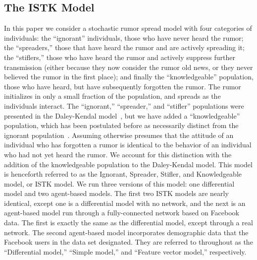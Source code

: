 \subsection{The ISTK Model}
\label{subsec:istk}

In this paper we consider a stochastic rumor spread model with four categories of individuals: the ``ignorant'' individuals, those who have never heard the rumor; the ``spreaders,'' those that have heard the rumor and are actively spreading it; the ``stiflers,'' those who have heard the rumor and actively suppress further transmission (either because they now consider the rumor old news, or they never believed the rumor in the first place); and finally the ``knowledgeable'' population, those who have heard, but have subsequently forgotten the rumor.
The rumor initializes in only a small fraction of the population, and spreads as the individuals interact.
The ``ignorant,'' ``spreader,'' and ``stifler'' populations were presented in the Daley-Kendal model~\cite{daley-1965}, but we have added a ``knowledgeable'' population, which has been postulated before as necessarily distinct from the ignorant population~\cite{zhao-2012, zhao-2011}.
Assuming otherwise presumes that the attitude of an individual who has forgotten a rumor is identical to the behavior of an individual who had not yet heard the rumor.
We account for this distinction with the addition of the knowledgeable population to the Daley-Kendal model.
This model is henceforth referred to as the Ignorant, Spreader, Stifler, and Knowledgeable model, or ISTK model.
We run three versions of this model: one differential model and two agent-based models.
The first two ISTK models are nearly identical, except one is a differential model with no network, and the next is an agent-based model run through a fully-connected network based on Facebook data.
The first is exactly the same as the differential model, except through a real network.
The second agent-based model incorporates demographic data that the Facebook users in the data set designated.
They are referred to throughout as the ``Differential model,''  ``Simple model,'' and ``Feature vector model,'' respectively.


